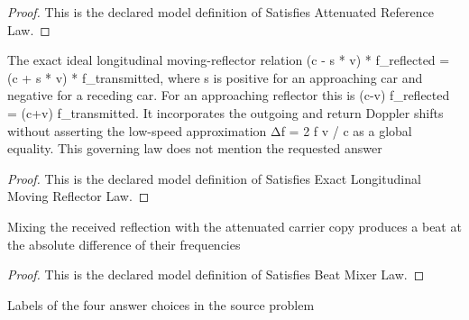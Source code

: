 \begin{proof}
  This is the declared model definition of Satisfies Attenuated Reference Law.
\end{proof}
\begin{definition}
  \label{def:physics:phyx-mini-0525:phyxminiproblems-problemphyxmini0525-satisfiesexactlongitudinalmovingreflectorlaw}
  The exact ideal longitudinal moving-reflector relation (c - s * v) * f\_reflected = (c + s * v) * f\_transmitted, where s is positive for an approaching car and negative for a receding car. For an approaching reflector this is (c-v) f\_reflected = (c+v) f\_transmitted. It incorporates the outgoing and return Doppler shifts without asserting the low-speed approximation Δf = 2 f v / c as a global equality. This governing law does not mention the requested answer
\end{definition}
\begin{proof}
  This is the declared model definition of Satisfies Exact Longitudinal Moving Reflector Law.
\end{proof}
\begin{definition}
  \label{def:physics:phyx-mini-0525:phyxminiproblems-problemphyxmini0525-satisfiesbeatmixerlaw}
  Mixing the received reflection with the attenuated carrier copy produces a beat at the absolute difference of their frequencies
\end{definition}
\begin{proof}
  This is the declared model definition of Satisfies Beat Mixer Law.
\end{proof}
\begin{definition}
  \label{def:physics:phyx-mini-0525:phyxminiproblems-problemphyxmini0525-answerchoice}
  Labels of the four answer choices in the source problem
\end{definition}
